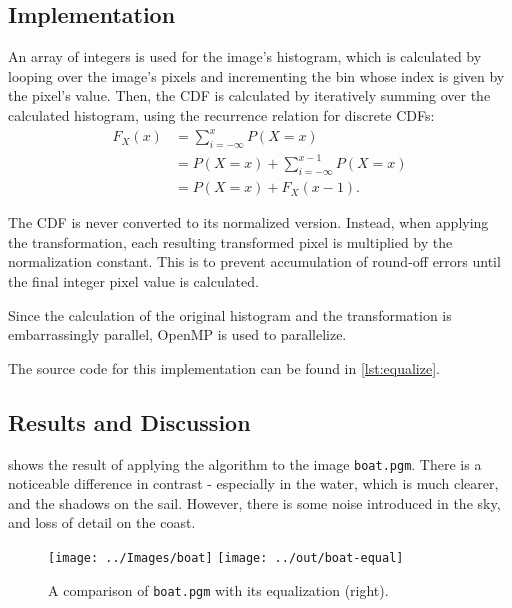 \documentclass[headings=optiontoheadandtoc,listof=totoc]{scrartcl}
\begin{document}
\subsection{Implementation}
An array of integers is used for the image's histogram, which is calculated by looping over the image's pixels and incrementing the bin whose index is given by the pixel's value. Then, the CDF is calculated by iteratively summing over the calculated histogram, using the recurrence relation for discrete CDFs:
\begin{equation}
	\begin{aligned}
		F_X(x) &= \sum_{i = -\infty}^x P(X = x)\\
			&= P(X = x) + \sum_{i = -\infty}^{x - 1} P(X = x)\\
			&= P(X = x) + F_X(x - 1).
	\end{aligned}
\end{equation}

The CDF is never converted to its normalized version. Instead, when applying the transformation, each resulting transformed pixel is multiplied by the normalization constant. This is to prevent accumulation of round-off errors until the final integer pixel value is calculated. \par

Since the calculation of the original histogram and the transformation is embarrassingly parallel, OpenMP is used to parallelize. \par

The source code for this implementation can be found in \cref{lst:equalize}.

\subsection{Results and Discussion}
\label{sec:equalization-results}

 shows the result of applying the algorithm to the image \texttt{boat.pgm}. There is a noticeable difference in contrast - especially in the water, which is much clearer, and the shadows on the sail. However, there is some noise introduced in the sky, and loss of detail on the coast.

\begin{figure}[ht]
	\centering
	\texttt{[image: ../Images/boat]}
	\texttt{[image: ../out/boat-equal]}
	\caption{A comparison of \texttt{boat.pgm} with its equalization (right).}
	\label{fig:equal-result-1}
\end{figure}
\end{document}
